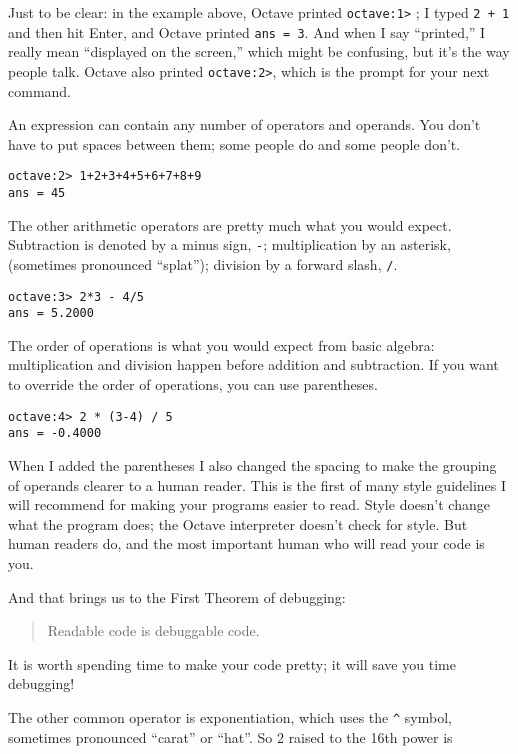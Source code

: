 Just to be clear: in the example above, Octave printed {\tt octave:1>} ; I
typed {\tt 2 + 1} and then hit Enter, and Octave printed {\tt ans = 3}.
And when I say ``printed,'' I really mean ``displayed on the screen,''
which might be confusing, but it's the way people talk. Octave also printed
{\tt octave:2>}, which is the prompt for your next command.

An expression can contain any number of operators and operands. You
don't have to put spaces between them; some people do and some people
don't.

\begin{verbatim}
octave:2> 1+2+3+4+5+6+7+8+9
ans = 45
\end{verbatim}

The other arithmetic operators are pretty much what you would expect.
Subtraction is denoted by a minus sign, {\tt -}; multiplication by
an asterisk, {\tt *} (sometimes pronounced ``splat''); division by
a forward slash, {\tt /}.

\begin{verbatim}
octave:3> 2*3 - 4/5
ans = 5.2000
\end{verbatim}

The order of operations is what you would expect from basic algebra:
multiplication and division happen before addition and subtraction.
If you want to override the order of operations, you can use parentheses.

\begin{verbatim}
octave:4> 2 * (3-4) / 5
ans = -0.4000
\end{verbatim}

When I added the parentheses I also changed the spacing to make the
grouping of operands clearer to a human reader. This is the first
of many style guidelines I will recommend for making your programs
easier to read. Style doesn't change what the program does; the Octave
interpreter doesn't check for style. But human readers do, and the
most important human who will read your code is you.

And that brings us to the First Theorem of debugging:

\begin{quote}
Readable code is debuggable code.
\end{quote}

It is worth spending time to make your code pretty; it will save
you time debugging!

The other common operator is exponentiation, which uses the \verb+^+
symbol, sometimes pronounced ``carat'' or ``hat''. So 2 raised to the
16th power is

